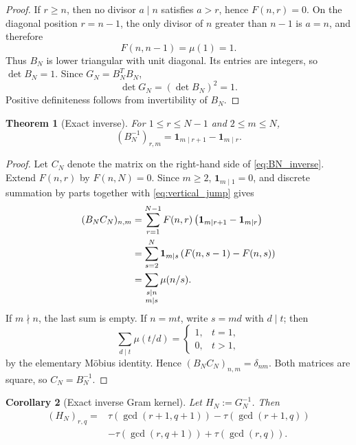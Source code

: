\documentclass[11pt]{amsart}
\numberwithin{equation}{section}
\theoremstyle{plain}
\newtheorem{theorem}{Theorem}[section]
\newtheorem{corollary}[theorem]{Corollary}
\theoremstyle{definition}
\theoremstyle{remark}
\newcommand{\mob}{\mu}
\begin{document}
\begin{proof}
If $r\ge n$, then no divisor $a\mid n$ satisfies $a>r$, hence $F(n,r)=0$.  On the diagonal position $r=n-1$, the only divisor of $n$ greater than $n-1$ is $a=n$, and therefore
\begin{equation}
F(n,n-1)=\mob(1)=1.
\end{equation}
Thus $B_N$ is lower triangular with unit diagonal.  Its entries are integers, so $\det B_N=1$.  Since $G_N=B_N^TB_N$,
\begin{equation}
\det G_N=(\det B_N)^2=1.
\end{equation}
Positive definiteness follows from invertibility of $B_N$.
\end{proof}

\begin{theorem}[Exact inverse]
\label{thm:BN_inverse}
For $1\le r\le N-1$ and $2\le m\le N$,
\begin{equation}
(B_N^{-1})_{r,m}
=
\mathbf 1_{m\mid r+1}-\mathbf 1_{m\mid r}.
\label{eq:BN_inverse}
\end{equation}
\end{theorem}

\begin{proof}
Let $C_N$ denote the matrix on the right-hand side of \eqref{eq:BN_inverse}.  Extend $F(n,r)$ by $F(n,N)=0$.  Since $m\ge2$, $\mathbf 1_{m\mid1}=0$, and discrete summation by parts together with \eqref{eq:vertical_jump} gives
\begin{align}
(B_NC_N)_{n,m}
&=\sum_{r=1}^{N-1}F(n,r)
\left(\mathbf 1_{m\mid r+1}-\mathbf 1_{m\mid r}\right)\notag\\
&=\sum_{s=2}^{N}\mathbf 1_{m\mid s}
\left(F(n,s-1)-F(n,s)\right)\notag\\
&=\sum_{\substack{s\mid n\\m\mid s}}\mob(n/s).
\label{eq:BC_divisor_sum}
\end{align}
If $m\nmid n$, the last sum is empty.  If $n=mt$, write $s=md$ with $d\mid t$; then
\begin{equation}
\sum_{d\mid t}\mob(t/d)
=
\begin{cases}
1,&t=1,\\
0,&t>1,
\end{cases}
\end{equation}
by the elementary M\"obius identity.  Hence $(B_NC_N)_{n,m}=\delta_{nm}$.  Both matrices are square, so $C_N=B_N^{-1}$.
\end{proof}

\begin{corollary}[Exact inverse Gram kernel]
\label{cor:GN_inverse_kernel}
Let $H_N:=G_N^{-1}$.  Then
\begin{align}
(H_N)_{r,q}
={}&\tau(\gcd(r+1,q+1))-\tau(\gcd(r+1,q))
\label{eq:GN_inverse_first}\\
&-\tau(\gcd(r,q+1))+\tau(\gcd(r,q)).
\label{eq:GN_inverse_second}
\end{align}
\end{corollary}
\end{document}
